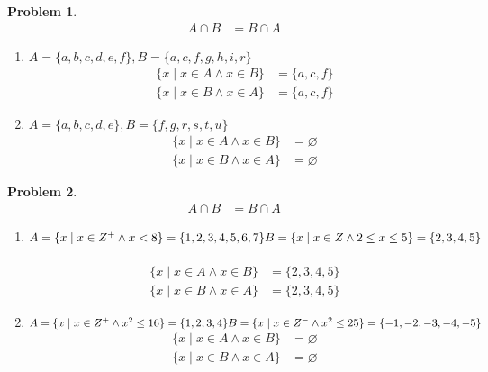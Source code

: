 \documentclass{article}
\theoremstyle{definition}
\newtheorem{problem}{Problem}[section]
\begin{document}
\begin{problem}
\[

    \begin{aligned}
       A \cap B &= B \cap A
    \end{aligned}
\]
    \begin{enumerate}[label=(\alph*)]
        Validate

        \item  \(A = \{a, b, c, d, e, f\}, B = \{a, c, f, g, h, i, r\}\)\
        \begin{align*}
            \{x \mid x \in A \land x \in B\} &= \{a, c, f\} \\
            \{x \mid x \in B \land x \in A\} &= \{a, c, f\}
        \end{align*}

        \item \(A = \{a, b, c, d, e\}, B = \{f, g, r, s, t, u\}\)
        \begin{align*}
            \{x \mid x \in A \land x \in B\} &= \varnothing \\
            \{x \mid x \in B \land x \in A\} &= \varnothing
        \end{align*}


    \end{enumerate}
\end{problem}


\begin{problem}
\[

    \begin{aligned}
       A \cap B &= B \cap A
    \end{aligned}
\]
    \begin{enumerate}[label=(\alph*)]
        Validate

        \item  \(A = \{x \mid x \in Z^+ \land x < 8\} = \{1, 2, 3, 4, 5, 6, 7\} \quad \\
        B = \{x \mid x \in Z \land 2 \leq x \leq 5\} = \{2, 3, 4, 5\}\)\
        \begin{align*}
            \{x \mid x \in A \land x \in B\} &=  \{2, 3, 4, 5\}\\
            \{x \mid x \in B \land x \in A\} &= \{2, 3, 4, 5\}
        \end{align*}

        \item \(A = \{x \mid x \in Z^+ \land x^2 \leq 16\} = \{1, 2, 3, 4\}\\
        B = \{x \mid x \in Z^- \land x^2 \leq 25\} = \{-1, -2, -3, -4, -5\}\)
        \begin{align*}
            \{x \mid x \in A \land x \in B\} &= \varnothing \\
            \{x \mid x \in B \land x \in A\} &= \varnothing
        \end{align*}


    \end{enumerate}
\end{problem}
\end{document}
